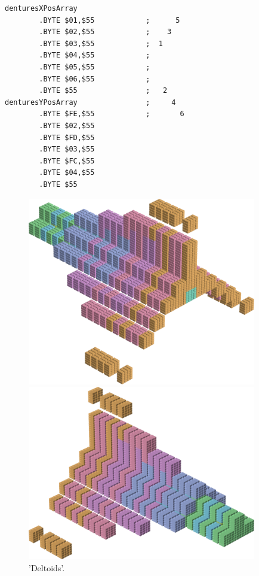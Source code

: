 \begin{minipage}[b]{0.48\linewidth}
\vspace{1cm}
\begin{lrbox}{\mybox}%
\begin{lstlisting}[basicstyle=\ttfamily\tiny,escapechar=\%]
denturesXPosArray
        .BYTE $01,$55            ;      5 
        .BYTE $02,$55            ;    3   
        .BYTE $03,$55            ;  1     
        .BYTE $04,$55            ;        
        .BYTE $05,$55            ;        
        .BYTE $06,$55            ;        
        .BYTE $55                ;   2    
denturesYPosArray                ;     4  
        .BYTE $FE,$55            ;       6
        .BYTE $02,$55
        .BYTE $FD,$55
        .BYTE $03,$55
        .BYTE $FC,$55
        .BYTE $04,$55
        .BYTE $55
\end{lstlisting}
\end{lrbox}%
\scalebox{0.8}{\usebox{\mybox}}

\end{minipage}
%
%
\begin{minipage}[b]{0.48\linewidth}
\begin{figure}[H]
    \centering
    \begin{adjustbox}{width=5cm,margin=0cm 0cm}
      \includegraphics[width=10cm]{src/colorspace_patterns/pattern3-45.png}%
    \end{adjustbox}
    \begin{adjustbox}{width=5cm,margin=0cm 0cm}
      \includegraphics[width=10cm]{src/colorspace_patterns/pattern3-225.png}%
    \end{adjustbox}
\caption{'Deltoids'.}
\end{figure}
\end{minipage}
